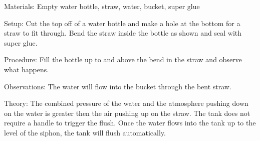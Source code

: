 \begin{multicols}{2}
\begin{description*}
\item[Materials:]{Empty water bottle, straw, water, bucket, super glue}
\item[Setup:]{Cut the top off of a water bottle and make a hole at the bottom for a straw to fit through. Bend the straw inside the bottle as shown and seal with super glue.}
\item[Procedure:]{Fill the bottle up to and above the bend in the straw and observe what happens.}
\item[Observations:]{The water will flow into the bucket through the bent straw.}
\item[Theory:]{The combined pressure of the water and the atmosphere pushing down on the water is greater then the air pushing up on the straw. The tank does not require a handle to trigger the flush. Once the water flows into the tank up to the level of the siphon, the tank will flush automatically. }
\end{description*}

%
%


\end{multicols}
